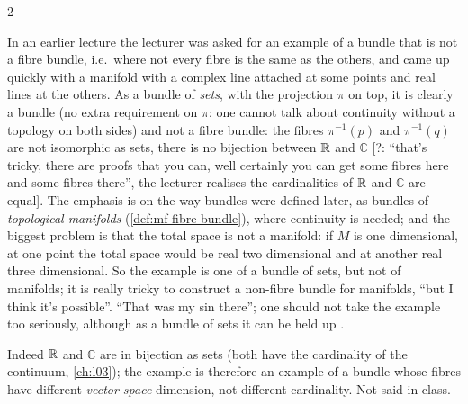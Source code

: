 \begin{paracol}{2}
\begin{remark}\label{rem:tb-correction}
In an earlier lecture the lecturer was asked for an example of a bundle that is not a fibre bundle, i.e.\ where not every fibre is the same as the others, and came up quickly with a manifold with a complex line attached at some points and real lines at the others. As a bundle of \emph{sets}, with the projection $\pi$ on top, it is clearly a bundle (no extra
requirement on $\pi$: one cannot talk about continuity without a topology on both sides) and not a fibre bundle: the fibres $\pi^{-1}(p)$ and $\pi^{-1}(q)$ are not isomorphic as sets, there is no bijection between $\mathbb{R}$ and $\mathbb C$ [?: ``that's tricky, there are proofs that you can, well certainly you can get some fibres here and some fibres there'', the lecturer
realises the cardinalities of $\mathbb{R}$ and $\mathbb C$ are equal]. The emphasis is on the way bundles were defined later, as bundles of \emph{topological manifolds} (\cref{def:mf-fibre-bundle}), where continuity is needed; and the biggest problem is that the total space is not a manifold: if $M$ is one dimensional, at one point the total space would be real two dimensional and at another real
three dimensional. So the example is one of a bundle of sets, but not of manifolds; it is really tricky to construct a non-fibre bundle for manifolds, ``but I think it's possible''. ``That was my sin there''; one should not take the example too seriously, although as a bundle of sets it can be held up      .
\end{remark}
\begin{coursenote}
Indeed $\mathbb{R}$ and $\mathbb C$ are in bijection as sets (both have the cardinality of the continuum, \cref{ch:l03}); the example is therefore an example of a bundle whose fibres have different \emph{vector space} dimension, not different cardinality. Not said in class.
\end{coursenote}


\end{paracol}
